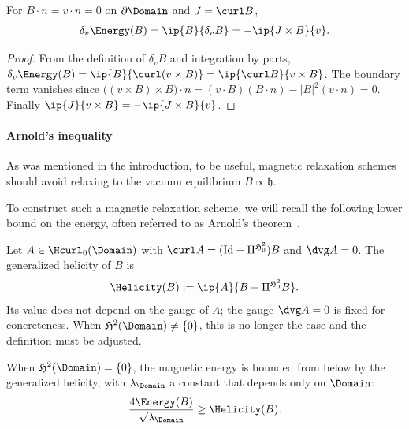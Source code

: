 \documentclass[%
 reprint,
 superscriptaddress,
 amsmath,amssymb,
 aps, nofootinbib, floatfix]{revtex4-2}
\begin{document}
\begin{proposition}
    \label{prop:first_variation}
    For $B \cdot n = v \cdot n = 0$ on $\partial \Domain$ and $J = \curl B$,
    \begin{align}
        \label{eq:first_variation}
        \delta_v \Energy(B) = \ip{B}{\delta_v B} = - \ip{J \times B}{v} .
    \end{align}
\end{proposition}
\begin{proof}
    From the definition of $\delta_v B$ and integration by parts, $\delta_v \Energy(B) = \ip{B}{\curl (v \times B)} = \ip{\curl B}{v \times B}$. The boundary term vanishes since $\big( (v \times B) \times B \big) \cdot n = (v \cdot B) (B \cdot n) - |B|^2 (v \cdot n) = 0$. Finally $\ip{J}{v \times B} = - \ip{J \times B}{v}$.
\end{proof}

\paragraph{Arnold's inequality}
As was mentioned in the introduction, to be useful, magnetic relaxation schemes should avoid relaxing to the vacuum equilibrium $B \propto \mathfrak h$.

To construct such a magnetic relaxation scheme, we will recall the following lower bound on the energy, often referred to as Arnold's theorem~\cite{arnold_asymptotic_1974}. 
\begin{definition}
    \label{def:helicity}
    Let $A \in \Hcurl_0(\Domain)$ with $\curl A = (\mathrm{Id} - \Pi^{{\mathfrak H}^2_0}) B$ and $\dvg A = 0$. The generalized helicity of $B$ is
    \begin{align}
        \label{eq:helicity_definition}
        \Helicity(B) := \ip{A}{B + \Pi^{{\mathfrak H}^2_0} B}.
    \end{align}
    Its value does not depend on the gauge of $A$; the gauge $\dvg A = 0$ is fixed for concreteness. When $\mathfrak H^2(\Domain) \neq \{ 0 \}$, this is no longer the case and the definition must be adjusted.
\end{definition}

\begin{proposition}
\label{prop:helicity_bounds_energy}
    When $\mathfrak H^2(\Domain) = \{ 0 \}$, the magnetic energy is bounded from below by the generalized helicity, with $\lambda_\Domain$ a constant that depends only on $\Domain$:
    \begin{align}
        \label{eq:arnold_inequality}
        \frac {4 \Energy(B)} {\sqrt{\lambda_\Domain}}  \geq \Helicity(B).
    \end{align}
\end{proposition}
\end{document}
